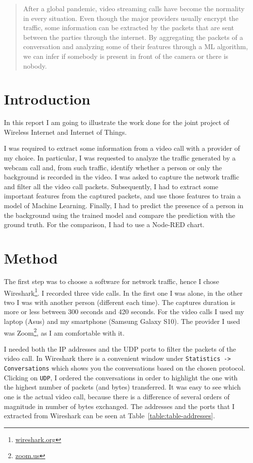 \documentclass[12pt, conference]{IEEEtran}
\begin{document}
\begin{abstract}
    After a global pandemic, video streaming calls have become the normality in every situation. Even though the major providers usually encrypt the traffic, some information can be extracted by the packets that are sent between the parties through the internet. By aggregating the packets of a conversation and analyzing some of their features through a ML algorithm, we can infer if somebody is present in front of the camera or there is nobody.
\end{abstract}

\section{Introduction}
In this report I am going to illustrate the work done for the joint project of Wireless Internet and Internet of Things.

I was required to extract some information from a video call with a provider of my choice. In particular, I was requested to analyze the traffic generated by a webcam call and, from such traffic, identify whether a person or only the background is recorded in the video. I was asked to capture the network traffic and filter all the video call packets. Subsequently, I had to extract some important features from the captured packets, and use those features to train a model of Machine Learning. Finally, I had to predict the presence of a person in the background using the trained model and compare the prediction with the ground truth. For the comparison, I had to use a Node-RED chart.

\section{Method}

The first step was to choose a software for network traffic, hence I chose Wireshark\footnote{\href{https://www.wireshark.org/}{wireshark.org}}. I recorded three vide calls. In the first one I was alone, in the other two I was with another person (different each time). The captures duration is more or less between 300 seconds and 420 seconds. For the video calls I used my laptop (Asus) and my smartphone (Samsung Galaxy S10). The provider I used was Zoom\footnote{\href{https://zoom.us/}{zoom.us}}, as I am comfortable with it.

I needed both the IP addresses and the UDP ports to filter the packets of the video call. In Wireshark there is a convenient window under \texttt{Statistics -> Conversations} which shows you the conversations based on the chosen protocol. Clicking on \texttt{UDP}, I ordered the conversations in order to highlight the one with the highest number of packets (and bytes) transferred. It was easy to see which one is the actual video call, because there is a difference of several orders of magnitude in number of bytes exchanged. The addresses and the ports that I extracted from Wireshark can be seen at Table~\ref{table:table-addresses}.
\end{document}
